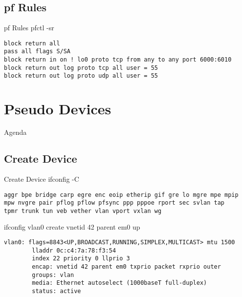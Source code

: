 \documentclass[14pt]{beamer}
\begin{document}
\subsection{pf Rules}
\begin{frame}[fragile]{pf Rules}
pfctl -sr
\scriptsize
\begin{verbatim}
block return all
pass all flags S/SA
block return in on ! lo0 proto tcp from any to any port 6000:6010
block return out log proto tcp all user = 55
block return out log proto udp all user = 55
\end{verbatim}
\end{frame}

\section{Pseudo Devices}
\begin{frame}{Agenda}
\tableofcontents[currentsection]
\end{frame}

\subsection{Create Device}
\begin{frame}[fragile]{Create Device}
ifconfig -C
\scriptsize
\begin{verbatim}
aggr bpe bridge carp egre enc eoip etherip gif gre lo mgre mpe mpip
mpw nvgre pair pflog pflow pfsync ppp pppoe rport sec svlan tap
tpmr trunk tun veb vether vlan vport vxlan wg
\end{verbatim}
\normalsize
ifconfig vlan0 create vnetid 42 parent em0 up
\scriptsize
\begin{verbatim}
vlan0: flags=8843<UP,BROADCAST,RUNNING,SIMPLEX,MULTICAST> mtu 1500
        lladdr 0c:c4:7a:78:f3:54
        index 22 priority 0 llprio 3
        encap: vnetid 42 parent em0 txprio packet rxprio outer
        groups: vlan
        media: Ethernet autoselect (1000baseT full-duplex)
        status: active
\end{verbatim}
\end{frame}
\end{document}
